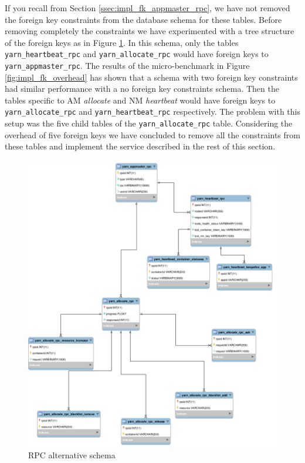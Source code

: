If you recall from Section \ref{ssec:impl_fk_appmaster_rpc}, we have
not removed the foreign key constraints from the database schema for
these tables. Before
removing completely the constraints we have experimented with a tree
structure of the foreign keys as in Figure
\ref{fig:impl_fk_alternate_schema}. In this schema, only the tables
\texttt{yarn\_heartbeat\_rpc} and \texttt{yarn\_allocate\_rpc} would
have foreign keys to \texttt{yarn\_appmaster\_rpc}. The results of the
micro-benchmark in Figure \ref{fig:impl_fk_overhead} has shown that a schema with two foreign key
constraints had similar performance with a no foreign key constraints
schema. Then the tables specific to AM \emph{allocate} and NM
\emph{heartbeat} would have foreign keys to
\texttt{yarn\_allocate\_rpc} and \texttt{yarn\_heartbeat\_rpc}
respectively. The problem with this setup was the five child tables
of the \texttt{yarn\_allocate\_rpc} table. Considering the overhead of
five foreign keys we have concluded
to remove all the constraints from these tables and implement the
service described in the rest of this section.

\begin{figure}
\centering
\includegraphics[scale=0.3]{resources/images/Implementation/rpc_fk_alternate_schema.png}
\caption{RPC alternative schema}
\label{fig:impl_fk_alternate_schema}
\end{figure}

